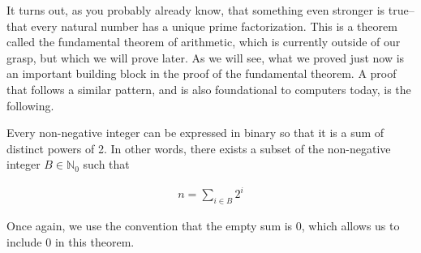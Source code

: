 \documentclass[twoside]{report}
\begin{document}
It turns out, as you probably already know, that something even stronger is true--that every natural number has a unique prime factorization. This is a theorem called the fundamental theorem of arithmetic, which is currently outside of our grasp, but which we will prove later. As we will see, what we proved just now is an important building block in the proof of the fundamental theorem. A proof that follows a similar pattern, and is also foundational to computers today, is the following.

\vspace{\baselineskip}
\begin{theorem}
	Every non-negative integer can be expressed in binary so that it is a sum of distinct powers of 2. In other words, there exists a subset of the non-negative integer $B \in \mathbb{N}_0$ such that
	
	\begin{align*}
		n = \sum_{i \in B} 2^i
	\end{align*}
	
	Once again, we use the convention that the empty sum is 0, which allows us to include 0 in this theorem.
\end{theorem}
\end{document}
